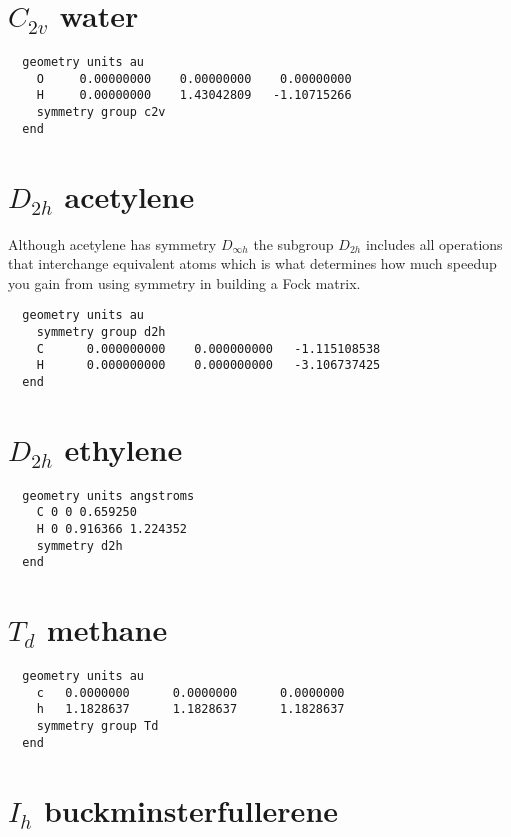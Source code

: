 \label{symexamples}

  \section{\protect$C_{2v}$ water}

\begin{verbatim}
  geometry units au
    O     0.00000000    0.00000000    0.00000000
    H     0.00000000    1.43042809   -1.10715266
    symmetry group c2v
  end
\end{verbatim}

  \section{\protect$D_{2h}$ acetylene}

Although acetylene has symmetry $D_{\infty h}$ the subgroup
$D_{2h}$ includes all operations that interchange equivalent atoms
which is what determines how much speedup you gain from using symmetry
in building a Fock matrix.

\begin{verbatim}
  geometry units au
    symmetry group d2h
    C      0.000000000    0.000000000   -1.115108538
    H      0.000000000    0.000000000   -3.106737425
  end
\end{verbatim}

  \section{\protect$D_{2h}$ ethylene}

\begin{verbatim}
  geometry units angstroms
    C 0 0 0.659250 
    H 0 0.916366 1.224352 
    symmetry d2h
  end
\end{verbatim}


  \section{\protect$T_d$ methane}

\begin{verbatim}
  geometry units au
    c   0.0000000      0.0000000      0.0000000
    h   1.1828637      1.1828637      1.1828637
    symmetry group Td
  end
\end{verbatim}

  \section{\protect$I_h$ buckminsterfullerene}

